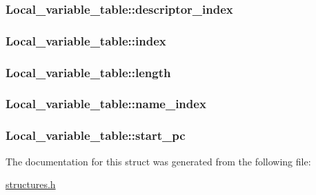 \subsubsection[{\texorpdfstring{descriptor\+\_\+index}{descriptor_index}}]{ Local\+\_\+variable\+\_\+table\+::descriptor\+\_\+index}\hypertarget{structLocal__variable__table_ac30f0857c677e82b9665b709369adb5c}{}\label{structLocal__variable__table_ac30f0857c677e82b9665b709369adb5c}
\subsubsection[{\texorpdfstring{index}{index}}]{ Local\+\_\+variable\+\_\+table\+::index}\hypertarget{structLocal__variable__table_aa9c60b3758f3edc8c4761af238e576a9}{}\label{structLocal__variable__table_aa9c60b3758f3edc8c4761af238e576a9}
\subsubsection[{\texorpdfstring{length}{length}}]{ Local\+\_\+variable\+\_\+table\+::length}\hypertarget{structLocal__variable__table_aa7ed2c337f001f6922abef82a7a2877b}{}\label{structLocal__variable__table_aa7ed2c337f001f6922abef82a7a2877b}
\subsubsection[{\texorpdfstring{name\+\_\+index}{name_index}}]{ Local\+\_\+variable\+\_\+table\+::name\+\_\+index}\hypertarget{structLocal__variable__table_ae14ab32d3cf126ede896ea6b1a7053a2}{}\label{structLocal__variable__table_ae14ab32d3cf126ede896ea6b1a7053a2}
\subsubsection[{\texorpdfstring{start\+\_\+pc}{start_pc}}]{ Local\+\_\+variable\+\_\+table\+::start\+\_\+pc}\hypertarget{structLocal__variable__table_a857ab3f5a0d3a22f1eb7eccdd9c034e1}{}\label{structLocal__variable__table_a857ab3f5a0d3a22f1eb7eccdd9c034e1}


The documentation for this struct was generated from the following file\+:\begin{DoxyCompactItemize}
\item 
\hyperlink{structures_8h}{structures.\+h}\end{DoxyCompactItemize}
